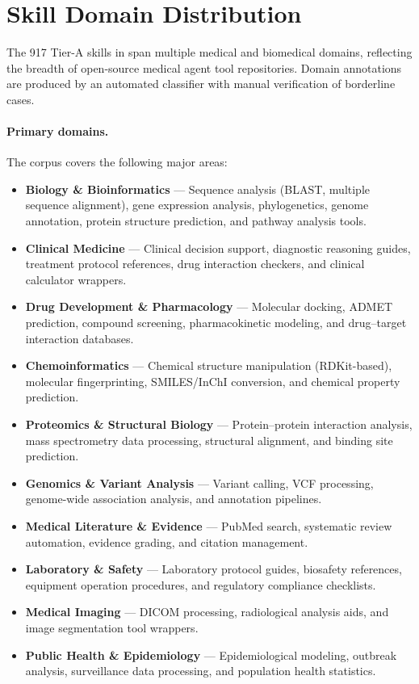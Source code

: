 \section{Skill Domain Distribution}
\label{app:domain_distribution}

The 917 Tier-A skills in \medskillbench span multiple medical and biomedical domains, reflecting the breadth of open-source medical agent tool repositories.
Domain annotations are produced by an automated classifier with manual verification of borderline cases.

\paragraph{Primary domains.}
The corpus covers the following major areas:
\begin{itemize}[nosep,leftmargin=*]
  \item \textbf{Biology \& Bioinformatics} --- Sequence analysis (BLAST, multiple sequence alignment), gene expression analysis, phylogenetics, genome annotation, protein structure prediction, and pathway analysis tools.
  \item \textbf{Clinical Medicine} --- Clinical decision support, diagnostic reasoning guides, treatment protocol references, drug interaction checkers, and clinical calculator wrappers.
  \item \textbf{Drug Development \& Pharmacology} --- Molecular docking, ADMET prediction, compound screening, pharmacokinetic modeling, and drug--target interaction databases.
  \item \textbf{Chemoinformatics} --- Chemical structure manipulation (RDKit-based), molecular fingerprinting, SMILES/InChI conversion, and chemical property prediction.
  \item \textbf{Proteomics \& Structural Biology} --- Protein--protein interaction analysis, mass spectrometry data processing, structural alignment, and binding site prediction.
  \item \textbf{Genomics \& Variant Analysis} --- Variant calling, VCF processing, genome-wide association analysis, and annotation pipelines.
  \item \textbf{Medical Literature \& Evidence} --- PubMed search, systematic review automation, evidence grading, and citation management.
  \item \textbf{Laboratory \& Safety} --- Laboratory protocol guides, biosafety references, equipment operation procedures, and regulatory compliance checklists.
  \item \textbf{Medical Imaging} --- DICOM processing, radiological analysis aids, and image segmentation tool wrappers.
  \item \textbf{Public Health \& Epidemiology} --- Epidemiological modeling, outbreak analysis, surveillance data processing, and population health statistics.
\end{itemize}


